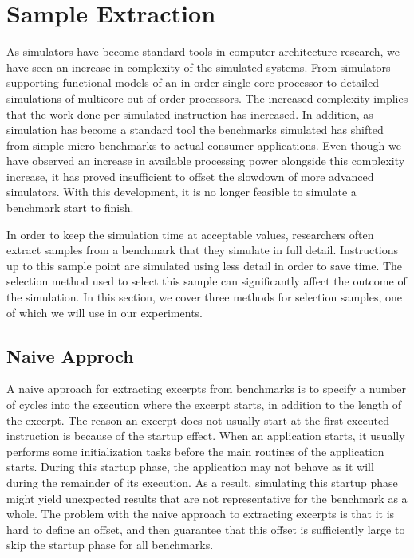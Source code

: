 \section{Sample Extraction}
\label{sec:methodology:sample_extraction}

As simulators have become standard tools in computer architecture research, we have seen an increase in complexity of the simulated systems. 
From simulators supporting functional models of an in-order single core processor to detailed simulations of multicore out-of-order processors.
The increased complexity implies that the work done per simulated instruction has increased.
In addition, as simulation has become a standard tool the benchmarks simulated has shifted from simple micro-benchmarks to actual consumer applications. 
Even though we have observed an increase in available processing power alongside this complexity increase, it has proved insufficient to offset the slowdown of more advanced simulators.
With this development, it is no longer feasible to simulate a benchmark start to finish.

In order to keep the simulation time at acceptable values, researchers often extract samples from a benchmark that they simulate in full detail. 
Instructions up to this sample point are simulated using less detail in order to save time.
The selection method used to select this sample can significantly affect the outcome of the simulation.
In this section, we cover three methods for selection samples, one of which we will use in our experiments.


\subsection{Naive Approch}
A naive approach for extracting excerpts from benchmarks is to specify a number of cycles into the execution where the excerpt starts, in addition to the length of the excerpt.
The reason an excerpt does not usually start at the first executed instruction is because of the startup effect.
When an application starts, it usually performs some initialization tasks before the main routines of the application starts.
During this startup phase, the application may not behave as it will during the remainder of its execution.
As a result, simulating this startup phase might yield unexpected results that are not representative for the benchmark as a whole.
The problem with the naive approach to extracting excerpts is that it is hard to define an offset, and then guarantee that this offset is sufficiently large to skip the startup phase for all benchmarks.

